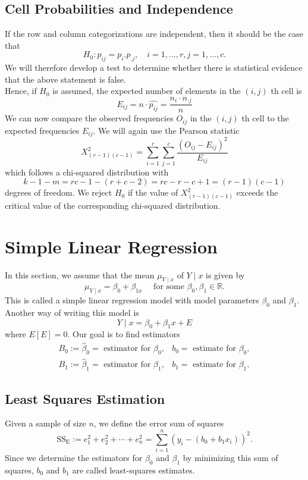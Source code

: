 \documentclass[a4paper,12pt]{article}
\begin{document}
\subsection{Cell Probabilities and Independence}
If the row and column categorizations are independent, then it should be the case that
$$
H_0: p_{i j}=p_i . p_{. j}, \quad i=1, \ldots, r, j=1, \ldots, c .
$$
We will therefore develop a test to determine whether there is statistical evidence that the above statement is false.\\
Hence, if $H_0$ is assumed, the expected number of elements in the $(i, j)$ th cell is
$$
E_{i j}=n \cdot \widehat{p_{i j}}=\frac{n_i \cdot n_{\cdot j}}{n}
$$
We can now compare the observed frequencies $O_{i j}$ in the $(i, j)$ th cell to the expected frequencies $E_{i j}$. We will again use the Pearson statistic
$$
X_{(r-1)(c-1)}^2=\sum_{i=1}^r \sum_{j=1}^c \frac{\left(O_{i j}-E_{i j}\right)^2}{E_{i j}}
$$
which follows a chi-squared distribution with
$$
k-1-m=r c-1-(r+c-2)=r c-r-c+1=(r-1)(c-1)
$$
degrees of freedom. We reject $H_0$ if the value of $X_{(r-1)(c-1)}^2$ exceeds the critical value of the corresponding chi-squared distribution.




\section{Simple Linear Regression}
In this section, we assume that the mean $\mu_{Y \mid x}$ of $Y \mid x$ is given by
$$
\mu_{Y \mid x}=\beta_0+\beta_{1 x} \quad \text { for some } \beta_0, \beta_1 \in \mathbb{R} .
$$
This is called a simple linear regression model with model parameters $\beta_0$ and $\beta_1$.
Another way of writing this model is
$$
Y \mid x=\beta_0+\beta_1 x+E
$$
where $E[E]=0$.
Our goal is to find estimators
$$
\begin{array}{ll}
B_0:=\widehat{\beta}_0=\text { estimator for } \beta_0, & b_0=\text { estimate for } \beta_0, \\
B_1:=\widehat{\beta}_1=\text { estimator for } \beta_1, & b_1=\text { estimate for } \beta_1,
\end{array}
$$
\subsection{Least Squares Estimation}
Given a sample of size $n$, we define the error sum of squares
$$
\mathrm{SS}_{\mathrm{E}}:=e_1^2+e_2^2+\cdots+e_n^2=\sum_{i=1}^n\left(y_i-\left(b_0+b_1 x_i\right)\right)^2 .
$$
Since we determine the estimators for $\beta_0$ and $\beta_1$ by minimizing this sum of squares, $b_0$ and $b_1$ are called least-squares estimates.
\end{document}
